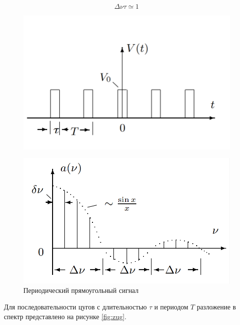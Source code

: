 \documentclass[12pt,a4paper]{article}
\begin{document}
\begin{equation}\label{eq:неопр}
	\Delta \nu \tau \simeq 1
\end{equation}

\begin{figure}[h]
	\begin{minipage}{0.49\linewidth}
		\centering
		\includegraphics[width=0.9\linewidth]{"res/square"}
		\label{fig:spectr}
	\end{minipage}
	\begin{minipage}{0.49\linewidth}
		\centering
		\includegraphics[width=0.9\linewidth]{"res/spectre_square"}
	\end{minipage}
	\caption{Периодический прямоугольный сигнал}
	\label{fig:sq}
\end{figure}

Для последовательности цугов с длительностью $ \tau  $ и периодом $ T $ разложение в спектр представлено на рисунке \ref{fig:zug}.
\end{document}
